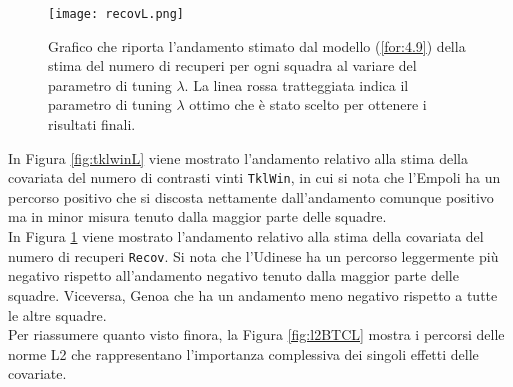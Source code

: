\begin{figure}[htbp]
	\begin{center}
		\texttt{[image: recovL.png]}
		\caption{Grafico che riporta l'andamento stimato dal modello (\ref{for:4.9}) della stima del numero di recuperi per ogni squadra al variare del parametro di tuning $\lambda$. La linea rossa tratteggiata indica il parametro di tuning $\lambda$ ottimo che è stato scelto per ottenere i risultati finali.} \label{fig:recovL}
	\end{center}
\end{figure}
In Figura \ref{fig:tklwinL} viene mostrato l'andamento relativo alla stima della covariata del numero di contrasti vinti \texttt{TklWin}, in cui si nota che l'Empoli ha un percorso positivo che si discosta nettamente dall'andamento comunque positivo ma in minor misura tenuto dalla maggior parte delle squadre.\\
In Figura \ref{fig:recovL} viene mostrato l'andamento relativo alla stima della covariata del numero di recuperi \texttt{Recov}. Si nota che l'Udinese ha un percorso leggermente più negativo rispetto all'andamento negativo tenuto dalla maggior parte delle squadre. Viceversa, Genoa che ha un andamento meno negativo rispetto a tutte le altre squadre.\\

Per riassumere quanto visto finora, la Figura \ref{fig:l2BTCL} mostra i percorsi delle norme L2 che rappresentano l'importanza complessiva dei singoli effetti delle covariate.

